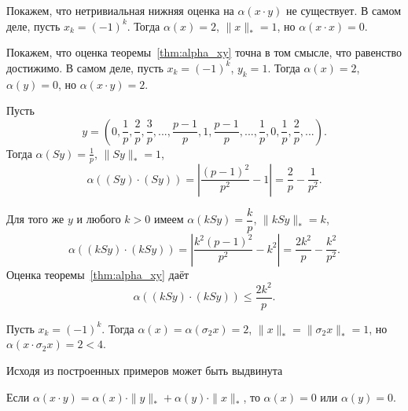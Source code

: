 \begin{example}
	Покажем, что нетривиальная нижняя оценка на $\alpha(x\cdot y)$ не существует.
	В самом деле,
	пусть $x_k = (-1)^k$.
	Тогда $\alpha(x) = 2$, $\|x\|_* = 1$,
	но $\alpha(x\cdot x) = 0$.
\end{example}

\begin{example}
	\label{ex:alpha-c_not_ideal}
	Покажем, что оценка теоремы~\ref{thm:alpha_xy} точна в том смысле,
	что равенство достижимо.
	В самом деле,
	пусть $x_k = (-1)^k$, $y_k = 1$.
	Тогда $\alpha(x) = 2$, $\alpha(y) = 0$,
	но $\alpha(x\cdot y) = 2$.
\end{example}

\begin{example}
	Пусть
	\begin{equation}
		y = \left(
			0, \frac{1}{p}, \frac{2}{p}, \frac{3}{p},
			...,
			\frac{p-1}{p}, 1, \frac{p-1}{p},
			...,
			\frac{1}{p},
			0,
			\frac{1}{p}, \frac{2}{p}, ...
		\right)
		.
	\end{equation}
	Тогда $\alpha(Sy) = \frac{1}{p}$, $\|Sy\|_* = 1$,
	\begin{equation}
		\alpha((Sy)\cdot(Sy)) =
		\left| \frac{(p-1)^2}{p^2} - 1 \right| =
		\frac{2}{p}-\frac{1}{p^2}
		.
	\end{equation}
\end{example}

\begin{example}
	Для того же $y$ и любого $k>0$ имеем
	$\alpha(kSy) = \dfrac{k}{p}$, $\|kSy\|_* = k$,
	\begin{equation}
		\alpha((kSy)\cdot(kSy)) =
		\left| \frac{k^2(p-1)^2}{p^2} - k^2 \right| =
		\frac{2k^2}{p}-\frac{k^2}{p^2}
		.
	\end{equation}
	Оценка теоремы~\ref{thm:alpha_xy} даёт
	\begin{equation}
		\alpha((kSy)\cdot(kSy)) \leq
		\frac{2k^2}{p}
		.
	\end{equation}
\end{example}



\begin{example}
	Пусть $x_k = (-1)^k$.
	Тогда $\alpha(x) = \alpha(\sigma_2 x) = 2$, $\|x\|_* = \|\sigma_2 x\|_* = 1$,
	но $\alpha(x\cdot \sigma_2 x) = 2 < 4$.
\end{example}

Исходя из построенных примеров может быть выдвинута
\begin{hypothesis}
	Если $\alpha(x\cdot y)= \alpha(x)\cdot \|y\|_* + \alpha(y)\cdot \|x\|_*$,
	то $\alpha(x) = 0$ или $\alpha(y) = 0$.
\end{hypothesis}
